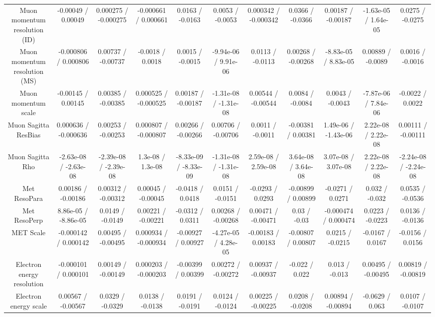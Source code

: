 \begin{table}[htbp]
\begin{center}
\begin{tabular}{|c|c|c|c|c|c|c|c|c|c|c|}
  Muon momentum resolution (ID) & -0.00049 / 0.00049 & 0.000275 / -0.000275 & -0.000661 / 0.000661 & 0.0163 / -0.0163 & 0.0053 / -0.0053 & 0.000342 / -0.000342 & 0.0366 / -0.0366 & 0.00187 / -0.00187 & -1.63e-05 / 1.64e-05 & 0.0275 / -0.0275 \\ 
  Muon momentum resolution (MS) & -0.000806 / 0.000806 & 0.00737 / -0.00737 & -0.0018 / 0.0018 & 0.0015 / -0.0015 & -9.94e-06 / 9.91e-06 & 0.0113 / -0.0113 & 0.00268 / -0.00268 & -8.83e-05 / 8.83e-05 & 0.00889 / -0.0089 & 0.0016 / -0.0016 \\ 
  Muon momentum scale & -0.00145 / 0.00145 & 0.00385 / -0.00385 & 0.000525 / -0.000525 & 0.00187 / -0.00187 & -1.31e-08 / -1.31e-08 & 0.00544 / -0.00544 & 0.0084 / -0.0084 & 0.0043 / -0.0043 & -7.87e-06 / 7.84e-06 & -0.0022 / 0.0022 \\ 
  Muon Sagitta ResBias & 0.000636 / -0.000636 & 0.00253 / -0.00253 & 0.000807 / -0.000807 & 0.00266 / -0.00266 & 0.00706 / -0.00706 & 0.0011 / -0.0011 & -0.00381 / 0.00381 & 1.49e-06 / -1.43e-06 & 2.22e-08 / 2.22e-08 & 0.00111 / -0.00111 \\ 
  Muon Sagitta Rho & -2.63e-08 / -2.63e-08 & -2.39e-08 / -2.39e-08 & 1.3e-08 / 1.3e-08 & -8.33e-09 / -8.33e-09 & -1.31e-08 / -1.31e-08 & 2.59e-08 / 2.59e-08 & 3.64e-08 / 3.64e-08 & 3.07e-08 / 3.07e-08 & 2.22e-08 / 2.22e-08 & -2.24e-08 / -2.24e-08 \\ 
  Met ResoPara & 0.00186 / -0.00186 & 0.00312 / -0.00312 & 0.00045 / -0.00045 & -0.0418 / 0.0418 & 0.0151 / -0.0151 & -0.0293 / 0.0293 & -0.00899 / 0.00899 & -0.0271 / 0.0271 & 0.032 / -0.032 & 0.0535 / -0.0536 \\ 
  Met ResoPerp & 8.86e-05 / -8.86e-05 & 0.0149 / -0.0149 & 0.00221 / -0.00221 & -0.0312 / 0.0311 & 0.00268 / -0.00268 & 0.00471 / -0.00471 & 0.03 / -0.03 & -0.000474 / 0.000474 & 0.0223 / -0.0223 & 0.0136 / -0.0136 \\ 
  MET Scale & -0.000142 / 0.000142 & 0.00495 / -0.00495 & 0.000934 / -0.000934 & -0.00927 / 0.00927 & -4.27e-05 / 4.28e-05 & -0.00183 / 0.00183 & -0.00807 / 0.00807 & 0.0215 / -0.0215 & -0.0167 / 0.0167 & -0.0156 / 0.0156 \\ 
  Electron energy resolution & -0.000101 / 0.000101 & 0.00149 / -0.00149 & 0.000203 / -0.000203 & -0.00399 / 0.00399 & 0.00272 / -0.00272 & 0.00937 / -0.00937 & -0.022 / 0.022 & 0.013 / -0.013 & 0.00495 / -0.00495 & 0.00819 / -0.00819 \\ 
  Electron energy scale & 0.00567 / -0.00567 & 0.0329 / -0.0329 & 0.0138 / -0.0138 & 0.0191 / -0.0191 & 0.0124 / -0.0124 & 0.00225 / -0.00225 & 0.0208 / -0.0208 & 0.00894 / -0.00894 & -0.0629 / 0.063 & 0.0107 / -0.0107 \\ 

\end{tabular}
\end{center}
\end{table}
